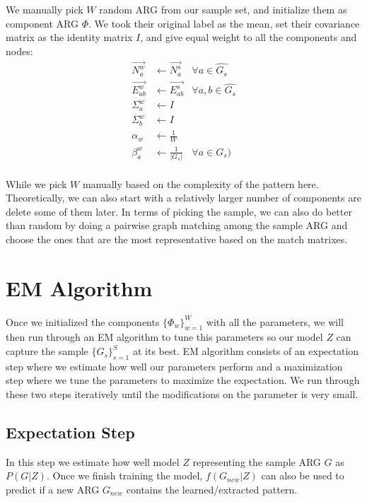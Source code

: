 We manually pick $W$ random ARG from our sample set, and initialize them as component ARG $\Phi$. We took their original label as the mean, set their covariance matrix as the identity matrix $I$, and give equal weight to all the components and nodes:
\begin{align} 
\overrightarrow{N^w_a} & \leftarrow \overrightarrow{N^s_a} & \forall a \in \widehat{G_s}\\
\overrightarrow{E^w_{ab}} & \leftarrow \overrightarrow{E^s_{ab}}& \forall a,b \in \widehat{G_s}\\
\Sigma^w_a & \leftarrow  I\\
\Sigma^w_b  & \leftarrow  I\\
\alpha_w & \leftarrow \frac{1}{W}\\
\beta^w_a & \leftarrow \frac{1}{|G_s|}& \forall a \in G_s)
\end{align}\\

While we pick $W$ manually based on the complexity of the pattern here. Theoretically, we can also start with a relatively larger number of components are delete some of them later. In terms of picking the sample, we can also do better than random by doing a pairwise graph matching among the sample ARG and choose the ones that are the most representative based on the match matrixes.

\newpage

\section{EM Algorithm}

Once we initialized the components $\{\Phi_w\}_{w=1}^W$ with all the parameters, we will then run through an EM algorithm to tune this parameters so our model $Z$ can capture the sample $\{G_s\}_{s=1}^S$ at its best. EM algorithm consists of an expectation step where we estimate how well our parameters perform and a maximization step where we tune the parameters to maximize the expectation. We run through these two steps iteratively until the modifications on the parameter is very small.

\subsection{Expectation Step}

In this step we estimate how well model $Z$ representing the sample ARG $G$ as $P(G|Z)$. Once we finish training the model, $f(G_{new}|Z)$ can also be used to predict if a new ARG $G_{new}$ contains the learned/extracted pattern. \\

